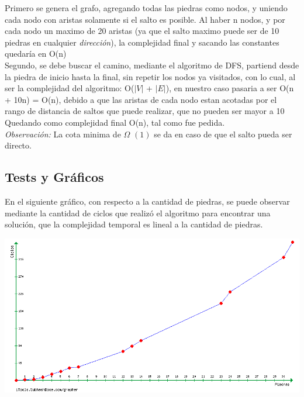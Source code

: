 Primero se genera el grafo, agregando todas las piedras como nodos, y uniendo cada nodo con aristas solamente si el salto es posible. Al haber n nodos, y por cada nodo un maximo de 20 aristas (ya que el salto maximo puede ser de 10 piedras en cualquier \textit{dirección}), la complejidad final y sacando las constantes quedaría en O(n)\\  
Segundo, se debe buscar el camino, mediante  el algoritmo de DFS, partiend desde la piedra de inicio hasta la final, sin repetir los nodos ya visitados, con lo cual, al ser la complejidad del algoritmo: O($|V|$ + $|E|$), en nuestro caso pasaria a ser O(n + 10n) = O(n), debido a que las aristas de cada nodo estan acotadas por el rango de distancia de saltos que puede realizar, que no pueden ser mayor a 10\\  
Quedando como complejidad final O(n), tal como fue pedida. \\
\textit{Observación:} La cota minima de $\Omega$ $(1)$ se da en caso de que el salto pueda ser directo.

\subsection{Tests y Gráficos}
En el siguiente gráfico, con respecto a la cantidad de piedras, se puede observar mediante la cantidad de ciclos que realizó el algoritmo para encontrar una solución, que la complejidad temporal es lineal a la cantidad de piedras. 
\begin {center}
\includegraphics[width=15cm]{./graficos/grafico_ej3_0.png}
\end {center} 

